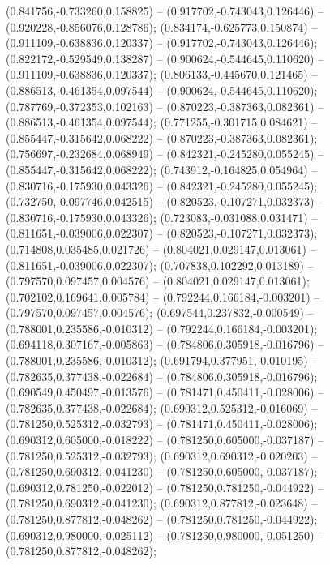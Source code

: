  (0.841756,-0.733260,0.158825) -- (0.917702,-0.743043,0.126446) -- (0.920228,-0.856076,0.128786);
 (0.834174,-0.625773,0.150874) -- (0.911109,-0.638836,0.120337) -- (0.917702,-0.743043,0.126446);
 (0.822172,-0.529549,0.138287) -- (0.900624,-0.544645,0.110620) -- (0.911109,-0.638836,0.120337);
 (0.806133,-0.445670,0.121465) -- (0.886513,-0.461354,0.097544) -- (0.900624,-0.544645,0.110620);
 (0.787769,-0.372353,0.102163) -- (0.870223,-0.387363,0.082361) -- (0.886513,-0.461354,0.097544);
 (0.771255,-0.301715,0.084621) -- (0.855447,-0.315642,0.068222) -- (0.870223,-0.387363,0.082361);
 (0.756697,-0.232684,0.068949) -- (0.842321,-0.245280,0.055245) -- (0.855447,-0.315642,0.068222);
 (0.743912,-0.164825,0.054964) -- (0.830716,-0.175930,0.043326) -- (0.842321,-0.245280,0.055245);
 (0.732750,-0.097746,0.042515) -- (0.820523,-0.107271,0.032373) -- (0.830716,-0.175930,0.043326);
 (0.723083,-0.031088,0.031471) -- (0.811651,-0.039006,0.022307) -- (0.820523,-0.107271,0.032373);
 (0.714808,0.035485,0.021726) -- (0.804021,0.029147,0.013061) -- (0.811651,-0.039006,0.022307);
 (0.707838,0.102292,0.013189) -- (0.797570,0.097457,0.004576) -- (0.804021,0.029147,0.013061);
 (0.702102,0.169641,0.005784) -- (0.792244,0.166184,-0.003201) -- (0.797570,0.097457,0.004576);
 (0.697544,0.237832,-0.000549) -- (0.788001,0.235586,-0.010312) -- (0.792244,0.166184,-0.003201);
 (0.694118,0.307167,-0.005863) -- (0.784806,0.305918,-0.016796) -- (0.788001,0.235586,-0.010312);
 (0.691794,0.377951,-0.010195) -- (0.782635,0.377438,-0.022684) -- (0.784806,0.305918,-0.016796);
 (0.690549,0.450497,-0.013576) -- (0.781471,0.450411,-0.028006) -- (0.782635,0.377438,-0.022684);
 (0.690312,0.525312,-0.016069) -- (0.781250,0.525312,-0.032793) -- (0.781471,0.450411,-0.028006);
 (0.690312,0.605000,-0.018222) -- (0.781250,0.605000,-0.037187) -- (0.781250,0.525312,-0.032793);
 (0.690312,0.690312,-0.020203) -- (0.781250,0.690312,-0.041230) -- (0.781250,0.605000,-0.037187);
 (0.690312,0.781250,-0.022012) -- (0.781250,0.781250,-0.044922) -- (0.781250,0.690312,-0.041230);
 (0.690312,0.877812,-0.023648) -- (0.781250,0.877812,-0.048262) -- (0.781250,0.781250,-0.044922);
 (0.690312,0.980000,-0.025112) -- (0.781250,0.980000,-0.051250) -- (0.781250,0.877812,-0.048262);
